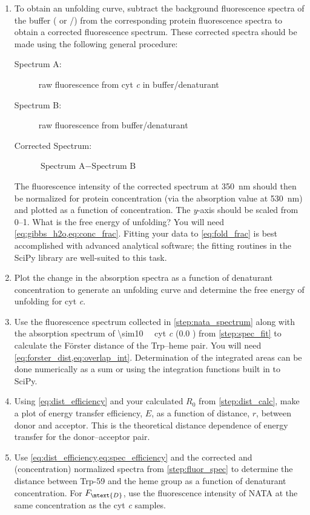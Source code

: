 \begin{enumerate}
	\item To obtain an unfolding curve, subtract the background fluorescence spectra of the buffer ( or /) from the corresponding protein fluorescence spectra to obtain a corrected fluorescence spectrum. 
	These corrected spectra should be made using the following general procedure:
	\begin{description}
		\item [Spectrum A:] raw fluorescence from cyt \emph{c} in buffer/denaturant
		\item [Spectrum B:] raw fluorescence from buffer/denaturant
		\item [Corrected Spectrum:] \( \text{Spectrum A} - \text{Spectrum B} \)
	\end{description}
	The fluorescence intensity of the corrected spectrum at \SI{350}{\nm} should then be normalized for protein concentration (via the absorption value at \SI{530}{\nm}) and plotted as a function of  concentration. 
	The \emph{y}-axis should be scaled from \numrange{0}{1}. 
	What is the free energy of unfolding?
	You will need \cref{eq:gibbs_h2o,eq:conc_frac}. 
	Fitting your data to \cref{eq:fold_frac} is best accomplished with advanced analytical software; the fitting routines in the SciPy library are well-suited to this task. 
	\label{step:spec_fit}
	\item Plot the change in the absorption spectra as a function of denaturant concentration to generate an unfolding curve and determine the free energy of unfolding for cyt \emph{c}.
	\label{step:abs_fit}
	\item Use the fluorescence spectrum collected in \cref{step:nata_spectrum} along with the absorption spectrum of \SI{\sim10}{\micro\Molar} cyt \emph{c} (\SI{0.0}{\Molar} ) from \cref{step:spec_fit} to calculate the Förster distance of the Trp--heme pair. 
	You will need \cref{eq:forster_dist,eq:overlap_int}.
	Determination of the integrated areas can be done numerically as a sum or using the integration functions built in to SciPy.
	\label{step:dist_calc}
	\item Using \cref{eq:dist_efficiency} and your calculated \( R_0 \) from \cref{step:dist_calc}, make a plot of energy transfer efficiency, \( E \), as a function of distance, \( r \), between donor and acceptor. 
	This is the theoretical distance dependence of energy transfer for the donor--acceptor pair. 
	\item Use \cref{eq:dist_efficiency,eq:spec_efficiency} and the corrected and (concentration) normalized spectra from \cref{step:fluor_spec} to determine the distance between Trp-59 and the heme group as a function of denaturant concentration. 
	For \( F_\mtext{D} \), use the fluorescence intensity of NATA at the same concentration as the cyt \emph{c} samples. 
\end{enumerate}

